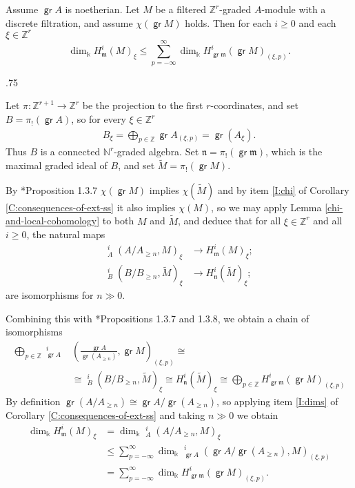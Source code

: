 \documentclass[11pt,fleqn]{article}
\makeatletter
\renewenvironment{proof}[1][\textit{Proof}]{\par
  \pushQED{\qed}%
  \normalfont \topsep.75\paraskip\relax
  \trivlist
  \item[\hskip\labelsep
        \itshape
    #1\@addpunct{.}]\ignorespaces
}{%
  \popQED\endtrivlist\@endpefalse
}
\newcommand\NN{\mathbb N}
\newcommand\ZZ{\mathbb Z}
\renewcommand\to{\longrightarrow}
\renewcommand\k{\Bbbk}
\newcommand\m{\mathfrak m}
\newcommand\n{\mathfrak n}
\DeclareMathOperator\GrExt{\underline{\mathsf{Ext}}}
\DeclareMathOperator\gr{\mathsf{gr}}
\makeatother
\begin{document}
\begin{Corollary*}
Assume $\gr A$ is noetherian. Let $M$ be a filtered $\ZZ^r$-graded $A$-module with a
discrete filtration, and assume $\chi(\gr M)$ holds. Then for each $i \geq 0$ and each 
$\xi \in \ZZ^r$ 
  \[
    \dim_\k H^i_\m(M)_\xi \leq \sum_{p=- \infty}^\infty \dim_\k H^i_{\gr \m}(\gr
    M)_{(\xi, p)}.
  \]
\end{Corollary*}
\begin{proof}
Let $\pi: \ZZ^{r+1} \to \ZZ^r$ be the projection to the first $r$-coordinates, and set $B
= \pi_!(\gr A)$, so for every $\xi \in \ZZ^r$
\begin{align*}
B_\xi = \bigoplus_{p \in \ZZ} \gr A_{(\xi, p)} = \gr (A_\xi).
\end{align*}
Thus $B$ is a connected $\NN^r$-graded algebra. Set $\n = \pi_!(\gr \m)$, which is
the maximal graded ideal of $B$, and set $\tilde M = \pi_!(\gr M)$.

By \cite{RZ2}*{Proposition 1.3.7} $\chi(\gr M)$ implies
$\chi(\tilde M)$ and by item \ref{I:chi} of Corollary \ref{C:consequences-of-ext-ss} it 
also implies $\chi(M)$, so we may apply Lemma \ref{chi-and-local-cohomology} to both $M$ 
and $\tilde M$, and deduce that for all $\xi \in \ZZ^r$ and all $i \geq 0$, the natural 
maps 
\begin{align*}
  \GrExt^i_A(A/A_{\geq n}, M)_\xi &\to H^i_\m(M)_\xi;\\
  \GrExt^i_B(B/B_{\geq n}, \tilde M)_\xi &\to H^i_\n( \tilde M)_\xi;
\end{align*}
are isomorphisms for $n \gg 0$.

Combining this with \cite{RZ2}*{Propositions 1.3.7 and 1.3.8}, we obtain a chain of
isomorphisms
\begin{align*}
\bigoplus_{p \in \ZZ} \GrExt^i_{\gr A}&\left(\frac{\gr A}{\gr (A_{\geq n})}, \gr M 
  \right)_{(\xi, p)} \cong \\
  &\cong \GrExt^i_B \left(B/B_{\geq n}, \tilde M \right)_\xi 
  \cong H^i_\n(\tilde M)_\xi 
  \cong \bigoplus_{p \in \ZZ} H^i_{\gr \m}(\gr M)_{(\xi, p)} 
\end{align*}
By definition $\gr(A/A_{\geq n}) \cong \gr A / \gr (A_{\geq n})$, so applying item 
\ref{I:dims} of Corollary \ref{C:consequences-of-ext-ss} and taking $n \gg 0$ we obtain
\begin{align*}
\dim_\k H^i_\m(M)_\xi 
  &= \dim_\k \GrExt^i_A(A/A_{\geq n}, M)_\xi \\
  &\leq \sum_{p = -\infty}^\infty \dim_\k
  \GrExt^i_{\gr A}(\gr A / \gr (A_{\geq n}), M)_{(\xi, p)} \\
  &= \sum_{p = -\infty}^\infty \dim_\k H^i_{\gr \m}(\gr M)_{(\xi, p)}.
\end{align*}
\end{proof}
\end{document}
